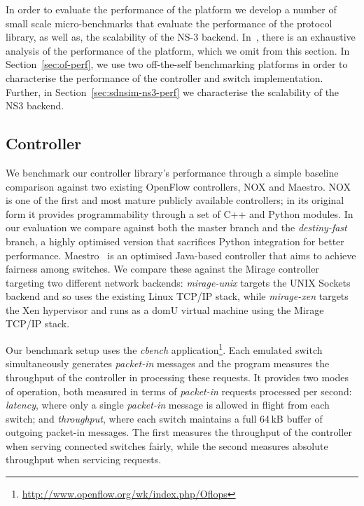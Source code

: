 In order to evaluate the performance of the \sdnsim platform we develop a number
of small scale micro-benchmarks that evaluate the performance of the \of
protocol library, as well as, the scalability of the NS-3 backend.
In~\cite{madhavapeddy2013}, there is an exhaustive analysis of the performance of the
\mirage platform, which we omit from this section. In Section~\ref{sec:of-perf},
we use two off-the-self \of benchmarking platforms in order to characterise the 
performance of the controller and switch implementation. Further, in
Section~\ref{sec:sdnsim-ns3-perf} we characterise the scalability of the NS3 
backend.


\subsection{\mirage Controller}

We benchmark our controller library's performance through a simple baseline
comparison against two existing OpenFlow controllers, NOX and Maestro.
NOX~\cite{nox} is one of the first and most mature publicly available \of
controllers; in its original form it provides programmability through a set of
C++ and Python modules. In our evaluation we compare against both the master
branch and the \emph{destiny-fast} branch, a highly optimised version that
sacrifices Python integration for better performance. Maestro~\cite{cai2011} is
an optimised Java-based controller that aims to achieve fairness among switches.
We compare these against the Mirage controller targeting two different network
backends: \emph{mirage-unix} targets the UNIX Sockets backend and so uses the
existing Linux TCP/IP stack, while \emph{mirage-xen} targets the Xen hypervisor
and runs as a domU virtual machine using the Mirage TCP/IP stack.

Our benchmark setup uses the \emph{cbench}
application\footnote{\url{http://www.openflow.org/wk/index.php/Oflops}}. Each
emulated switch simultaneously generates \emph{packet-in} messages and the
program measures the throughput of the controller in processing these requests.
It provides two modes of operation, both measured in terms of \emph{packet-in}
requests processed per second: \emph{latency}, where only a single
\emph{packet-in} message is allowed in flight from each switch; and
\emph{throughput}, where each switch maintains a full 64\,kB buffer of outgoing
packet-in messages. The first measures the throughput of the controller when
serving connected switches fairly, while the second measures absolute throughput
when servicing requests.
                                                                       

